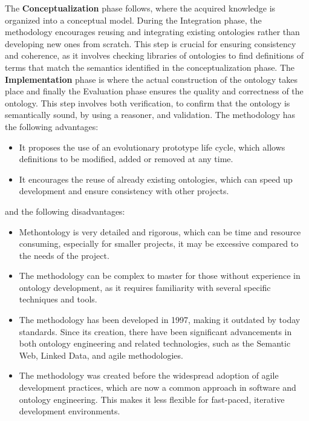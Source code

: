 The \textbf{Conceptualization} phase follows, where the acquired knowledge is organized into a conceptual model.
During the Integration phase, the methodology encourages reusing and integrating existing ontologies rather than developing new ones from scratch. 
This step is crucial for ensuring consistency and coherence, as it involves checking libraries of ontologies to find definitions of terms that match the semantics identified in the conceptualization phase.
The \textbf{Implementation} phase is where the actual construction of the ontology takes place and finally the Evaluation phase ensures the quality and correctness of the ontology.
This step involves both verification, to confirm that the ontology is semantically sound, by using a reasoner, and validation. The methodology has the following advantages: 
\begin{itemize}
    \item It proposes the use of an evolutionary prototype life cycle, which allows definitions to be modified, added or removed at any time.

    \item It encourages the reuse of already existing ontologies, which can speed up development and ensure consistency with other projects. 
\end{itemize}
and the following disadvantages:
\begin{itemize}
    \item Methontology is very detailed and rigorous, which can be time and resource consuming, especially for smaller projects, it may be excessive compared to the needs of the project.

    \item The methodology can be complex to master for those without experience in ontology development, as it requires familiarity with several specific techniques and tools.

    \item The methodology has been developed in 1997, making it outdated by today standards. Since its creation, there have been significant advancements in both ontology engineering and related technologies, such as the Semantic Web, Linked Data, and agile methodologies.

    \item The methodology was created before the widespread adoption of agile development practices, which are now a common approach in software and ontology engineering. This makes it less flexible for fast-paced, iterative development environments.
\end{itemize}

